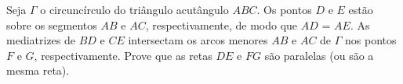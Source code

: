 Seja $\Gamma$ o circuncírculo do triângulo acutângulo $ABC$. Os pontos $D$ e $E$ estão sobre os segmentos $AB$ e $AC$, respectivamente, de modo que $AD$ = $AE$. As mediatrizes de $BD$ e $CE$ intersectam os arcos menores $AB$ e $AC$ de $\Gamma$ nos pontos $F$ e $G$, respectivamente. Prove que as retas $DE$ e $FG$ são paralelas (ou são a mesma reta).
